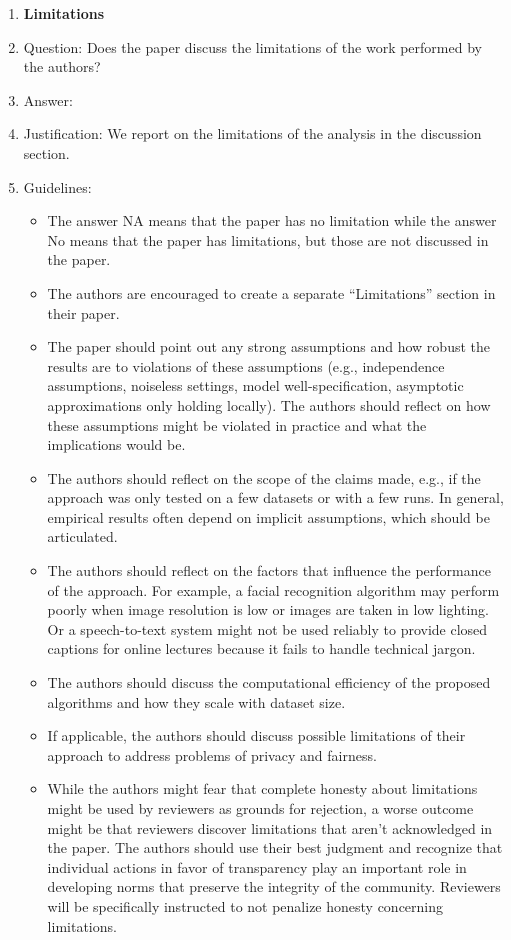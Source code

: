 \documentclass{article} %
\newcounter{ct}
\theoremstyle{definition}
\theoremstyle{remark}
\begin{document}
\begin{enumerate}
\item {\bf Limitations}
    \item[] Question: Does the paper discuss the limitations of the work performed by the authors?
    \item[] Answer: \answerYes{} %
    \item[] Justification: We report on the limitations of the analysis in the discussion section.
    \item[] Guidelines:
    \begin{itemize}
        \item The answer NA means that the paper has no limitation while the answer No means that the paper has limitations, but those are not discussed in the paper.
        \item The authors are encouraged to create a separate ``Limitations'' section in their paper.
        \item The paper should point out any strong assumptions and how robust the results are to violations of these assumptions (e.g., independence assumptions, noiseless settings, model well-specification, asymptotic approximations only holding locally). The authors should reflect on how these assumptions might be violated in practice and what the implications would be.
        \item The authors should reflect on the scope of the claims made, e.g., if the approach was only tested on a few datasets or with a few runs. In general, empirical results often depend on implicit assumptions, which should be articulated.
        \item The authors should reflect on the factors that influence the performance of the approach. For example, a facial recognition algorithm may perform poorly when image resolution is low or images are taken in low lighting. Or a speech-to-text system might not be used reliably to provide closed captions for online lectures because it fails to handle technical jargon.
        \item The authors should discuss the computational efficiency of the proposed algorithms and how they scale with dataset size.
        \item If applicable, the authors should discuss possible limitations of their approach to address problems of privacy and fairness.
        \item While the authors might fear that complete honesty about limitations might be used by reviewers as grounds for rejection, a worse outcome might be that reviewers discover limitations that aren't acknowledged in the paper. The authors should use their best judgment and recognize that individual actions in favor of transparency play an important role in developing norms that preserve the integrity of the community. Reviewers will be specifically instructed to not penalize honesty concerning limitations.
    \end{itemize}


\end{enumerate}
\end{document}
